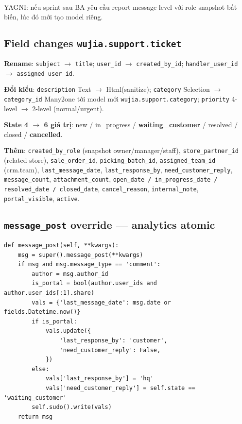 YAGNI: nếu sprint sau BA yêu cầu report message-level với role snapshot bất biến, lúc đó mới tạo model riêng.

\subsection{Field changes \texttt{wujia.support.ticket}}

\textbf{Rename}: \texttt{subject} $\rightarrow$ \texttt{title}; \texttt{user\_id} $\rightarrow$ \texttt{created\_by\_id}; \texttt{handler\_user\_id} $\rightarrow$ \texttt{assigned\_user\_id}.

\textbf{Đổi kiểu}: \texttt{description} Text $\rightarrow$ Html(sanitize); \texttt{category} Selection $\rightarrow$ \texttt{category\_id} Many2one tới model mới \texttt{wujia.support.category}; \texttt{priority} 4-level $\rightarrow$ 2-level (normal/urgent).

\textbf{State 4 $\rightarrow$ 6 giá trị}: new / in\_progress / \textbf{waiting\_customer} / resolved / closed / \textbf{cancelled}.

\textbf{Thêm}: \texttt{created\_by\_role} (snapshot owner/manager/staff), \texttt{store\_partner\_id} (related store), \texttt{sale\_order\_id}, \texttt{picking\_batch\_id}, \texttt{assigned\_team\_id} (crm.team), \texttt{last\_message\_date}, \texttt{last\_response\_by}, \texttt{need\_customer\_reply}, \texttt{message\_count}, \texttt{attachment\_count}, \texttt{open\_date / in\_progress\_date / resolved\_date / closed\_date}, \texttt{cancel\_reason}, \texttt{internal\_note}, \texttt{portal\_visible}, \texttt{active}.

\subsection{\texttt{message\_post} override --- analytics atomic}

\begin{lstlisting}[style=python]
def message_post(self, **kwargs):
    msg = super().message_post(**kwargs)
    if msg and msg.message_type == 'comment':
        author = msg.author_id
        is_portal = bool(author.user_ids and author.user_ids[:1].share)
        vals = {'last_message_date': msg.date or fields.Datetime.now()}
        if is_portal:
            vals.update({
                'last_response_by': 'customer',
                'need_customer_reply': False,
            })
        else:
            vals['last_response_by'] = 'hq'
            vals['need_customer_reply'] = self.state == 'waiting_customer'
        self.sudo().write(vals)
    return msg
\end{lstlisting}

